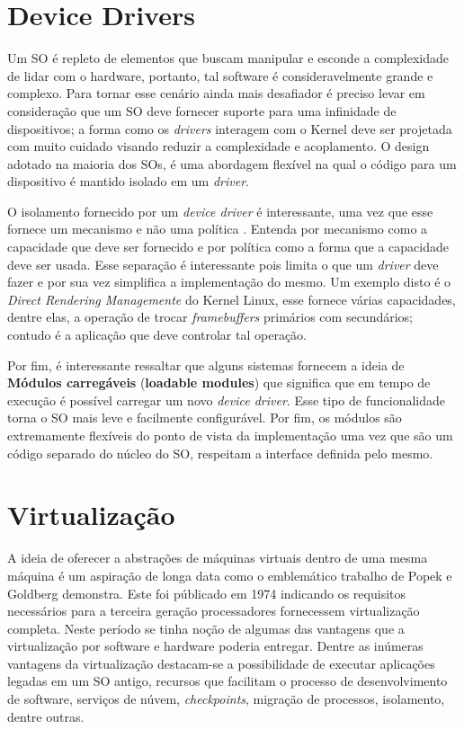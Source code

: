 \section{Device Drivers}
\label{sec:dd}

Um SO é repleto de elementos que buscam manipular e esconde a complexidade de
lidar com o hardware, portanto, tal software é consideravelmente grande e
complexo. Para tornar esse cenário ainda mais desafiador é preciso levar em
consideração que um SO deve fornecer suporte para uma infinidade de
dispositivos; a forma como os \emph{drivers} interagem com o Kernel deve ser
projetada com muito cuidado visando reduzir a complexidade e acoplamento.  O
design adotado na maioria dos SOs, é uma abordagem flexível na qual o código
para um dispositivo é mantido isolado em um \emph{driver}.

O isolamento fornecido por um \emph{device driver} é interessante, uma vez que
esse fornece um mecanismo e não uma política \cite{ddbook}. Entenda por
mecanismo como a capacidade que deve ser fornecido e por política como a forma
que a capacidade deve ser usada. Esse separação é interessante pois limita o
que um \emph{driver} deve fazer e por sua vez simplifica a implementação do
mesmo. Um exemplo disto é o \emph{Direct Rendering Managemente} do Kernel
Linux, esse fornece várias capacidades, dentre elas, a operação de trocar
\emph{framebuffers} primários com secundários; contudo é a aplicação que deve
controlar tal operação.

Por fim, é interessante ressaltar que alguns sistemas fornecem a ideia de
\textbf{Módulos carregáveis} (\textbf{loadable modules}) que significa que em
tempo de execução é possível carregar um novo \emph{device driver}. Esse tipo
de funcionalidade torna o SO mais leve e facilmente configurável. Por fim, os
módulos são extremamente flexíveis do ponto de vista da implementação uma vez
que são um código separado do núcleo do SO, respeitam a interface definida pelo
mesmo.

\section{Virtualização}
\label{sec:virtualizacao}


A ideia de oferecer a abstrações de máquinas virtuais dentro de uma mesma
máquina é um aspiração de longa data como o emblemático trabalho de Popek e
Goldberg \cite{popek} demonstra. Este foi públicado em 1974 indicando os
requisitos necessários para a terceira geração processadores fornecessem
virtualização completa. Neste período se tinha noção de algumas das vantagens
que a virtualização por software e hardware poderia entregar. Dentre as
inúmeras vantagens da virtualização destacam-se a possibilidade de executar
aplicações legadas em um SO antigo, recursos que facilitam o processo de
desenvolvimento de software, serviços de núvem, \emph{checkpoints}, migração de
processos, isolamento, dentre outras.

